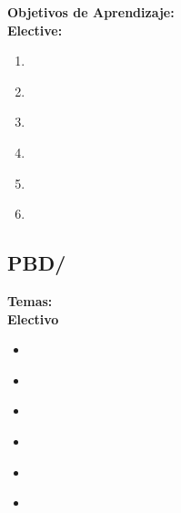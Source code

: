 \noindent \textbf{Objetivos de Aprendizaje:}\\
\noindent \textbf{Elective:}
\begin{enumerate}
	\setcounter{enumi}{0}
	\item \PBDWebPlatformsLODesignAndSimple\xspace[\PBDWebPlatformsLODesignAndSimpleLevel]\label{sec:BOK:PBDWebPlatformsLODesignAndSimple}
	\item \PBDWebPlatformsLODescribeTheTheOn\xspace[\PBDWebPlatformsLODescribeTheTheOnLevel]\label{sec:BOK:PBDWebPlatformsLODescribeTheTheOn}
	\item \PBDWebPlatformsLOCompareAndProgramming\xspace[\PBDWebPlatformsLOCompareAndProgrammingLevel]\label{sec:BOK:PBDWebPlatformsLOCompareAndProgramming}
	\item \PBDWebPlatformsLODescribeTheSoftware\xspace[\PBDWebPlatformsLODescribeTheSoftwareLevel]\label{sec:BOK:PBDWebPlatformsLODescribeTheSoftware}
	\item \PBDWebPlatformsLODiscussHowImpact\xspace[\PBDWebPlatformsLODiscussHowImpactLevel]\label{sec:BOK:PBDWebPlatformsLODiscussHowImpact}
	\item \PBDWebPlatformsLOReview\xspace[\PBDWebPlatformsLOReviewLevel]\label{sec:BOK:PBDWebPlatformsLOReview}
\end{enumerate}


\subsection{PBD/\PBDMobilePlatforms}\label{sec:BOK:PBDMobilePlatforms}
\noindent \textbf{Temas:}\\
\noindent \textbf{Electivo}
\begin{itemize}
	\item \PBDMobilePlatformsTopicMobile\label{sec:BOK:PBDMobilePlatformsTopicMobile}
	\item \PBDMobilePlatformsTopicChallenges\label{sec:BOK:PBDMobilePlatformsTopicChallenges}
	\item \PBDMobilePlatformsTopicLocation\label{sec:BOK:PBDMobilePlatformsTopicLocation}
	\item \PBDMobilePlatformsTopicPerformance\label{sec:BOK:PBDMobilePlatformsTopicPerformance}
	\item \PBDMobilePlatformsTopicMobilePlatform\label{sec:BOK:PBDMobilePlatformsTopicMobilePlatform}
	\item \PBDMobilePlatformsTopicEmerging\label{sec:BOK:PBDMobilePlatformsTopicEmerging}
\end{itemize}


